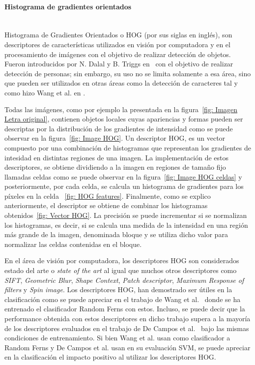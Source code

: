 \paragraph{Histograma de gradientes orientados} ~\\

	Histograma de Gradientes Orientados o HOG (por sus siglas en inglés), son descriptores de características utilizados en visión por computadora y en el procesamiento de imágenes con el objetivo de realizar detección de objetos. Fueron introducidos por N. Dalal y B. Triggs en~\cite{DT05} con el objetivo de realizar detección de personas; sin embargo, su uso no se limita solamente a esa área, sino que pueden ser utilizados en otras áreas como la detección de caracteres tal y como hizo Wang et al. en \cite{wang}.
	
	Todas las imágenes, como por ejemplo la presentada en la figura~\ref{fig: Imagen Letra original}, contienen objetos locales cuyas apariencias y formas pueden ser descriptas por la distribución de los gradientes de intensidad como se puede observar en la figura~\ref{fig: Image HOG}.	Un descriptor HOG, es un vector compuesto por una combinación de histogramas que representan los gradientes de intesidad en distintas regiones de una imagen. La implementación de estos descriptores, se obtiene dividiendo a la imagen en regiones de tamaño fijo llamadas celdas como se puede observar en la figura~\ref{fig: Image HOG celdas} y posteriormente, por cada celda, se calcula un histograma de gradientes para los píxeles en la celda ~\ref{fig: HOG features}. Finalmente, como se explico anteriormente, el descriptor se obtiene de combinar los histogramas obtenidos~\ref{fig: Vector HOG}. La precisión se puede incrementar si se normalizan los histogramas, es decir, si se calcula una medida de la intensidad en una región más grande de la imagen, denominada bloque y se utiliza dicho valor para normalizar las celdas contenidas en el bloque.
	
	
	En el área de visión por computadora, los descriptores HOG son considerados estado del arte o \textit{state of the art} al igual que muchos otros descriptores como \textit{SIFT}, \textit{Geometric Blur}, \textit{Shape Context}, \textit{Patch descriptor}, \textit{Maximum Response of filters} y \textit{Spin image}. Los descriptores HOG, han demostrado ser útiles en la clasificación como se puede apreciar en el trabajo de Wang et al.~\cite{wang} donde se ha entrenado el clasificador Random Ferns con estos. Incluso, se puede decir que la performance obtenida con estos descriptores en dicho trabajo supera a la mayoría de los descriptores evaluados en el trabajo de De Campos et al.~\cite{dCBV09} bajo las mismas condiciones de entrenamiento. Si bien Wang et al. usan como clasificador a Random Ferns y De Campos et al. usan en su evaluación SVM, se puede apreciar en la clasificación el impacto positivo al utilizar los descriptores HOG.
	
